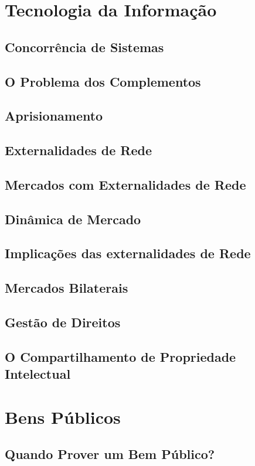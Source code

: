 \documentclass[a4paper,11pt,oneside]{book}
\theoremstyle{definition}
\theoremstyle{break}
\begin{document}
\chapter{Tecnologia da Informação}

\section{Concorrência de Sistemas}
\section{O Problema dos Complementos}
\section{Aprisionamento}
\section{Externalidades de Rede}
\section{Mercados com Externalidades de Rede}
\section{Dinâmica de Mercado}
\section{Implicações das externalidades de Rede}
\section{Mercados Bilaterais}
\section{Gestão de Direitos}
\section{O Compartilhamento de Propriedade Intelectual}

\chapter{Bens Públicos}

\section{Quando Prover um Bem Público?}
\end{document}
